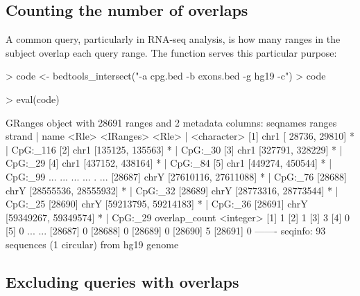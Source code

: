 \documentclass[10pt]{article}
\begin{document}
\subsection{Counting the number of overlaps}

A common query, particularly in RNA-seq analysis, is how many ranges
in the subject overlap each query range. The 
function serves this particular purpose:
\begin{Schunk}
\begin{Sinput}
> code <- bedtools_intersect("-a cpg.bed -b exons.bed -g hg19 -c")
> code
\end{Sinput}
\begin{Sinput}
> eval(code)
\end{Sinput}
\begin{Soutput}
GRanges object with 28691 ranges and 2 metadata columns:
          seqnames               ranges strand |        name
             <Rle>            <IRanges>  <Rle> | <character>
      [1]     chr1     [ 28736,  29810]      * |    CpG:_116
      [2]     chr1     [135125, 135563]      * |     CpG:_30
      [3]     chr1     [327791, 328229]      * |     CpG:_29
      [4]     chr1     [437152, 438164]      * |     CpG:_84
      [5]     chr1     [449274, 450544]      * |     CpG:_99
      ...      ...                  ...    ... .         ...
  [28687]     chrY [27610116, 27611088]      * |     CpG:_76
  [28688]     chrY [28555536, 28555932]      * |     CpG:_32
  [28689]     chrY [28773316, 28773544]      * |     CpG:_25
  [28690]     chrY [59213795, 59214183]      * |     CpG:_36
  [28691]     chrY [59349267, 59349574]      * |     CpG:_29
          overlap_count
              <integer>
      [1]             1
      [2]             1
      [3]             3
      [4]             0
      [5]             0
      ...           ...
  [28687]             0
  [28688]             0
  [28689]             0
  [28690]             5
  [28691]             0
  -------
  seqinfo: 93 sequences (1 circular) from hg19 genome
\end{Soutput}
\end{Schunk}

\subsection{Excluding queries with overlaps}
\end{document}
